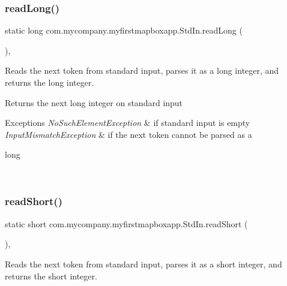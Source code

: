 \subsubsection{\texorpdfstring{read\+Long()}{readLong()}}
{\footnotesize\ttfamily static long com.\+mycompany.\+myfirstmapboxapp.\+Std\+In.\+read\+Long (\begin{DoxyParamCaption}{ }\end{DoxyParamCaption})\hspace{0.3cm}{\ttfamily [inline]}, {\ttfamily [static]}}

Reads the next token from standard input, parses it as a long integer, and returns the long integer.

\begin{DoxyReturn}{Returns}
the next long integer on standard input 
\end{DoxyReturn}

\begin{DoxyExceptions}{Exceptions}
{\em No\+Such\+Element\+Exception} & if standard input is empty \\
\hline
{\em Input\+Mismatch\+Exception} & if the next token cannot be parsed as a
\begin{DoxyCode}
\textcolor{keywordtype}{long} 
\end{DoxyCode}
 \\
\hline
\end{DoxyExceptions}
\mbox{\label{classcom_1_1mycompany_1_1myfirstmapboxapp_1_1_std_in_aeb2d54881b5dedc247ef806a979b1f16}} 
\subsubsection{\texorpdfstring{read\+Short()}{readShort()}}
{\footnotesize\ttfamily static short com.\+mycompany.\+myfirstmapboxapp.\+Std\+In.\+read\+Short (\begin{DoxyParamCaption}{ }\end{DoxyParamCaption})\hspace{0.3cm}{\ttfamily [inline]}, {\ttfamily [static]}}

Reads the next token from standard input, parses it as a short integer, and returns the short integer.

